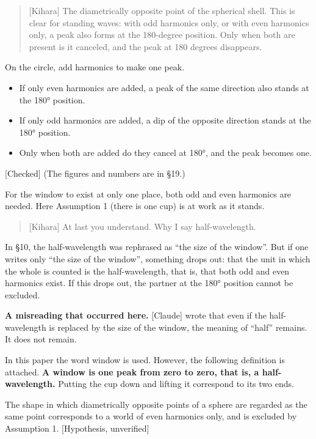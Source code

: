 \documentclass[
  a4paper,
]{article}
\providecommand{\tightlist}{%
  \setlength{\itemsep}{0pt}\setlength{\parskip}{0pt}}
\begin{document}
\begin{quote}
{[}Kihara{]} The diametrically opposite point of the spherical shell.
This is clear for standing waves: with odd harmonics only, or with even
harmonics only, a peak also forms at the 180-degree position. Only when
both are present is it canceled, and the peak at 180 degrees disappears.
\end{quote}

On the circle, add harmonics to make one peak.

\begin{itemize}
\tightlist
\item
  If only even harmonics are added, a peak of the same direction also
  stands at the 180° position.
\item
  If only odd harmonics are added, a dip of the opposite direction
  stands at the 180° position.
\item
  Only when both are added do they cancel at 180°, and the peak becomes
  one.
\end{itemize}

{[}Checked{]} (The figures and numbers are in §19.)

For the window to exist at only one place, both odd and even harmonics
are needed. Here Assumption 1 (there is one cup) is at work as it
stands.

\begin{quote}
{[}Kihara{]} At last you understand. Why I say half-wavelength.
\end{quote}

In §10, the half-wavelength was rephrased as ``the size of the window''.
But if one writes only ``the size of the window'', something drops out:
that the unit in which the whole is counted is the half-wavelength, that
is, that both odd and even harmonics exist. If this drops out, the
partner at the 180° position cannot be excluded.

\textbf{A misreading that occurred here.} {[}Claude{]} wrote that even
if the half-wavelength is replaced by the size of the window, the
meaning of ``half'' remains. It does not remain.

In this paper the word window is used. However, the following definition
is attached. \textbf{A window is one peak from zero to zero, that is, a
half-wavelength.} Putting the cup down and lifting it correspond to its
two ends.

The shape in which diametrically opposite points of a sphere are
regarded as the same point corresponds to a world of even harmonics
only, and is excluded by Assumption 1. {[}Hypothesis, unverified{]}
\end{document}
